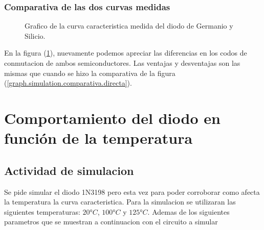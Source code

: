 \documentclass[chaptersright]{informeutn}
\begin{document}
      \section{Comparativa de las dos curvas medidas}
      \begin{figure}[!ht]
        \centering
        \caption{Grafico de la curva caracteristica medida del diodo de Germanio y Silicio.}
        \label{graph.comparativa.medida}
      \end{figure}

      En la figura (\ref{graph.comparativa.medida}), nuevamente podemos apreciar las diferencias en los codos de
      conmutacion de ambos semiconductores. Las ventajas y desventajas son las mismas que cuando se hizo la comparativa
      de la figura (\ref{graph.simulation.comparativa.directa}).

  \part{Comportamiento del diodo en función de la temperatura}
    \chapter{Actividad de simulacion}
        Se pide simular el diodo 1N3198 pero esta vez para poder corroborar como afecta la temperatura la curva
        caracteristica. Para la simulacion se utilizaran las siguientes temperaturas: $20°C$, $100°C$ y $125°C$. Ademas
        de los siguientes parametros que se muestran a continuacion con el circuito a simular
\end{document}
